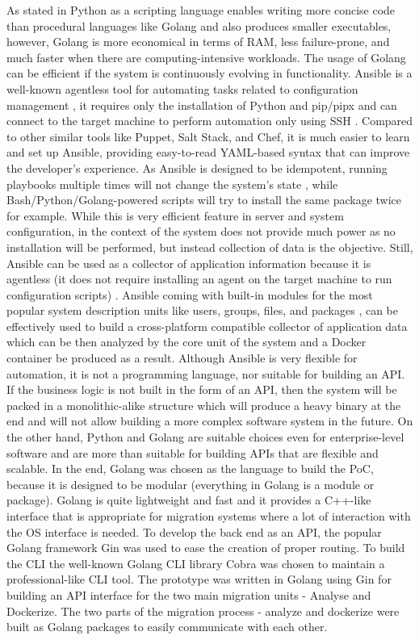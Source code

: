 \documentclass[twocolumn]{article}
\begin{document}
As stated in \cite{NanzEtAl-2015} Python as a scripting language enables writing more concise code than procedural languages like Golang and also produces smaller executables, however, Golang is more economical in terms of RAM, less failure-prone, and much faster when there are computing-intensive workloads. The usage of Golang can be efficient if the system is continuously evolving in functionality. Ansible is a well-known agentless tool for automating tasks related to configuration management \cite{Elradi-2023}, it requires only the installation of Python and pip/pipx \cite{Sesto-2022} and can connect to the target machine to perform automation only using SSH \cite{Elradi-2023}. Compared to other similar tools like Puppet, Salt Stack, and Chef, it is much easier to learn and set up Ansible, providing easy-to-read YAML-based syntax \cite{ChoiEtAl-2023} that can improve the developer’s experience. As Ansible is designed to be idempotent, running playbooks multiple times will not change the system's state \cite{ChoiEtAl-2023}, while Bash/Python/Golang-powered scripts will try to install the same package twice for example. While this is very efficient feature in server and system configuration, in the context of the system does not provide much power as no installation will be performed, but instead collection of data is the objective. Still, Ansible can be used as a collector of application information because it is agentless (it does not require installing an agent on the target machine to run configuration scripts) \cite{ChoiEtAl-2023}. Ansible coming with built-in modules for the most popular system description units like users, groups, files, and packages \cite{Kumar-2023}, can be effectively used to build a cross-platform compatible collector of application data which can be then analyzed by the core unit of the system and a Docker container be produced as a result. Although Ansible is very flexible for automation, it is not a programming language, nor suitable for building an API. If the business logic is not built in the form of an API, then the system will be packed in a monolithic-alike structure which will produce a heavy binary at the end and will not allow building a more complex software system in the future. On the other hand, Python and Golang are suitable choices even for enterprise-level software and are more than suitable for building APIs that are flexible and scalable. In the end, Golang was chosen as the language to build the PoC, because it is designed to be modular (everything in Golang is a module or package). Golang is quite lightweight and fast and it provides a C++-like interface that is appropriate for migration systems where a lot of interaction with the OS interface is needed. To develop the back end as an API, the popular Golang framework Gin was used to ease the creation of proper routing. To build the CLI the well-known Golang CLI library Cobra was chosen to maintain a professional-like CLI tool. The prototype was written in Golang using Gin for building an API interface for the two main migration units - Analyse and Dockerize. The two parts of the migration process - analyze and dockerize were built as Golang packages to easily communicate with each other. 
\end{document}
